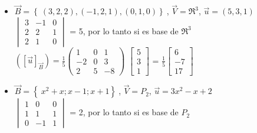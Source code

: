 \begin{itemize}
\item $\vec{B}= \left\lbrace\ (3,2,2), (-1,2,1),(0,1,0)\right\rbrace\ $, $\vec{V}= \Re^{3}$, $\vec{u}=(5,3,1)$\\

$\begin{vmatrix}
 3& -1 & 0\\ 
 2& 2 & 1\\ 
 2& 1 & 0
\end{vmatrix}$ = 5, por lo tanto si es base de $\Re^{3}$\\


$(\left [ \vec{u} \right ]_{\vec{B}})=\frac{1}{5}\begin{pmatrix}
1& 0 & 1\\ 
-2& 0 & 3\\ 
2& 5 & -8
\end{pmatrix}$ $\begin{bmatrix}
5\\ 
3\\ 
1
\end{bmatrix}$ = $\frac{1}{5}\begin{bmatrix}
6\\ 
-7\\ 
17
\end{bmatrix}$
\item $\vec{B}= \left\lbrace\ x^{2}+x; x-1;x+1\right\rbrace\ $, $\vec{V}= P_{2}$, $\vec{u}=3x^{2}-x+2$\\

$\begin{vmatrix}
 1& 0 & 0\\ 
 1& 1 & 1\\ 
 0& -1 & 1
\end{vmatrix}$ = 2, por lo tanto si es base de $P_{2}$\\



\end{itemize}
